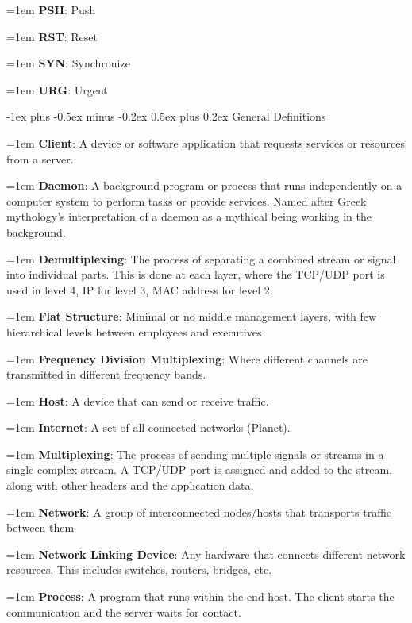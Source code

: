 \documentclass[letterpaper,8pt]{extarticle}
\makeatletter
\newcommand{\definition}[2]{
  \hangindent=1em
  \textbf{#1}: #2%
}
\renewcommand{\section}{\@startsection{section}{1}{0mm}%
  {-1ex plus -0.5ex minus -0.2ex}%
  {0.5ex plus 0.2ex}%
{\color{h1} \normalfont\small\bfseries}}
\makeatother
\begin{document}
\begin{multicols*}{5}
\begin{multicols*}{2}
    \definition{PSH}{Push}
    
    \definition{RST}{Reset}
    
    \definition{SYN}{Synchronize}
    
    \definition{URG}{Urgent}
    
  \end{multicols*}
  
  \section{General Definitions}
  
  \definition{Client}{A device or software application that requests services or resources from a server.}
  
  \definition{Daemon}{A background program or process that runs independently on a computer system to perform tasks or provide services. Named after Greek mythology's interpretation of a daemon as a mythical being working in the background.}
  
  \definition{Demultiplexing}{The process of separating a combined stream or signal into individual parts. This is done at each layer, where the TCP/UDP port is used in level 4, IP for level 3, MAC address for level 2.}
  
  \definition{Flat Structure}{Minimal or no middle management layers, with few hierarchical levels between employees and executives}
  
  \definition{Frequency Division Multiplexing}{Where different channels are transmitted in different frequency bands.}
  
  \definition{Host}{A device that can send or receive traffic.}
  
  \definition{Internet}{A set of all connected networks (Planet).}
  
  \definition{Multiplexing}{The process of sending multiple signals or streams in a single complex stream. A TCP/UDP port is assigned and added to the stream, along with other headers and the application data.}
  
  \definition{Network}{A group of interconnected nodes/hosts that transports traffic between them}
  
  \definition{Network Linking Device}{Any hardware that connects different network resources. This includes switches, routers, bridges, etc.}
  
  \definition{Process}{A program that runs within the end host. The client starts the communication and the server waits for contact.}
  

\end{multicols*}
\end{document}

